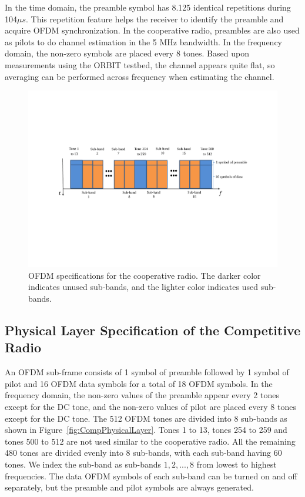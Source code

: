 In the time domain, the preamble symbol has 8.125 identical repetitions during 104$\mu s$. This repetition feature helps the receiver to identify the preamble and acquire OFDM synchronization. In the cooperative radio, preambles are also used as pilots to do channel estimation in the 5 MHz bandwidth. In the frequency domain, the non-zero symbols are placed every 8 tones. Based upon measurements using the ORBIT testbed, the channel appears quite flat, so averaging can be performed across frequency when estimating the channel.

\begin{figure}[tpb]
  \begin{center}
    \centerline{\includegraphics[width=160mm]{CoopPhysicalLayer.pdf}}
    \caption{OFDM specifications for the cooperative radio. The darker color indicates unused sub-bands, and the lighter color indicates used sub-bands.}
    \label{fig:CoopPhysicalLayer}
  \end{center}
\end{figure}

\subsection{Physical Layer Specification of the Competitive Radio}
An OFDM sub-frame consists of 1 symbol of preamble followed by 1 symbol of pilot and 16 OFDM data symbols for a total of 18 OFDM symbols. In the frequency domain, the non-zero values of the preamble appear every 2 tones except for the DC tone, and the non-zero values of pilot are placed every 8 tones except for the DC tone. The 512 OFDM tones are divided into 8 sub-bands as shown in Figure~\ref{fig:CompPhysicalLayer}. Tones 1 to 13, tones 254 to 259 and tones 500 to 512 are not used similar to the cooperative radio. All the remaining 480 tones are divided evenly into 8 sub-bands, with each sub-band having 60 tones. We index the sub-band as sub-bands $1,2,...,8$ from lowest to highest frequencies. The data OFDM symbols of each sub-band can be turned on and off separately, but the preamble and pilot symbols are always generated.

